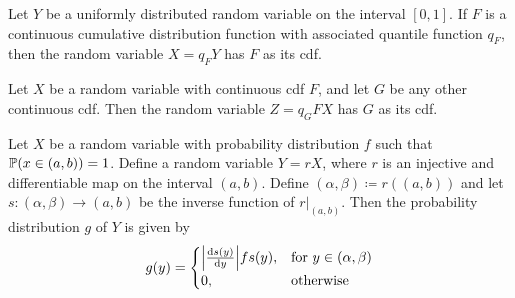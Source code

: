 \begin{corollary}
    \label{cor:}
    Let \(Y\) be a uniformly distributed random variable on the interval \([0,
            1]\). If \(F\) is a continuous cumulative distribution function with associated
    quantile function \(q_F\), then the random variable \(X = q_F Y\) has \(F\) as
    its cdf.
\end{corollary}

\begin{corollary}
    \label{cor:choose-distribution}
    Let \(X\) be a random variable with continuous cdf \(F\), and let \(G\) be any
    other continuous cdf. Then the random variable \(Z = q_G F X\) has \(G\) as its
    cdf.
\end{corollary}

\begin{proposition}
    \label{prop:injective-diff-random-variable-pdf}
    Let \(X\) be a random variable with probability distribution \(f\) such that
    \(\operatorname{\mathbb{P}}(x \in (a, b)) = 1\). Define a random variable \(Y = r X\), where \(r\)
    is an injective and differentiable map on the interval \((a, b)\). Define
    \((\alpha, \beta) \coloneq r((a, b))\) and let \(s: (\alpha, \beta) \to (a, b)\)
    be the inverse function of \(r|_{(a, b)}\). Then the probability distribution
    \(g\) of \(Y\) is given by
    \[
        g(y) =
        \begin{cases}
            \Big| \frac{\mathrm{d} s(y)}{\mathrm{d} y} \Big| f s(y) ,
               & \text{for } y \in (\alpha, \beta) \\
            0, & \text{otherwise}
        \end{cases}
    \]
\end{proposition}

